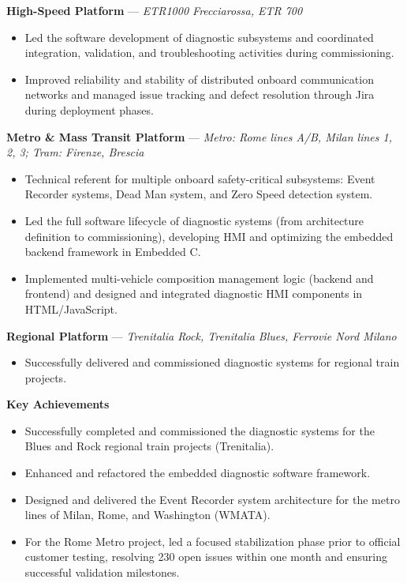 \documentclass[letterpaper,10pt]{article}
\newcommand{\resumeItem}[1]{
  \item\small{
    {#1 \vspace{-2pt}}
  }
}
\newcommand{\resumeItemListStart}{\begin{itemize}[rightmargin=0.1in]\vspace{-3pt}}
\newcommand{\resumeItemListEnd}{\end{itemize}\vspace{-3pt}}
\begin{document}
        \vspace{2pt}
        \item
        \small{\textbf{High-Speed Platform} --- \textit{ETR1000 Frecciarossa, ETR 700}}
        \resumeItemListStart
          \resumeItem{
            Led the software development of diagnostic subsystems and coordinated integration,
            validation, and troubleshooting activities during commissioning.
          }
          \resumeItem{
            Improved reliability and stability of distributed onboard communication networks and
            managed issue tracking and defect resolution through Jira during deployment phases.
          }
        \resumeItemListEnd

        \vspace{2pt}
        \item
        \small{\textbf{Metro \& Mass Transit Platform} --- \textit{Metro: Rome lines A/B, Milan lines 1, 2, 3; Tram: Firenze, Brescia}}
        \resumeItemListStart
          \resumeItem{
            Technical referent for multiple onboard safety-critical subsystems: Event Recorder
            systems, Dead Man system, and Zero Speed detection system.
          }
          \resumeItem{
            Led the full software lifecycle of diagnostic systems (from architecture definition to
            commissioning), developing HMI and optimizing the embedded backend framework in
            Embedded C.
          }
          \resumeItem{
            Implemented multi-vehicle composition management logic (backend and frontend) and
            designed and integrated diagnostic HMI components in HTML/JavaScript.
          }
        \resumeItemListEnd

        \vspace{2pt}
        \item
        \small{\textbf{Regional Platform} --- \textit{Trenitalia Rock, Trenitalia Blues, Ferrovie Nord Milano}}
        \resumeItemListStart
          \resumeItem{
            Successfully delivered and commissioned diagnostic systems for regional train projects.
          }
        \resumeItemListEnd

        \vspace{2pt}
        \item
        \small{\textbf{Key Achievements}}
        \resumeItemListStart
          \resumeItem{
            Successfully completed and commissioned the diagnostic systems for the Blues and Rock
            regional train projects (Trenitalia).
          }
          \resumeItem{
            Enhanced and refactored the embedded diagnostic software framework.
          }
          \resumeItem{
            Designed and delivered the Event Recorder system architecture for the metro lines of
            Milan, Rome, and Washington (WMATA).
          }
          \resumeItem{
            For the Rome Metro project, led a focused stabilization phase prior to official customer
            testing, resolving 230 open issues within one month and ensuring successful validation
            milestones.
          }
        \resumeItemListEnd
\end{document}
